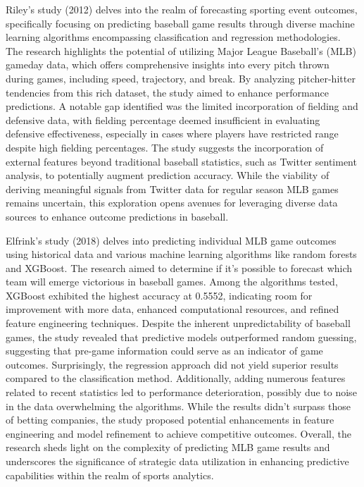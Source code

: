 \documentclass[12pt, english]{article}
\begin{document}
Riley's study (2012) delves into the realm of forecasting sporting event outcomes, specifically focusing on predicting baseball game results through diverse machine learning algorithms encompassing classification and regression methodologies. The research highlights the potential of utilizing Major League Baseball's (MLB) gameday data, which offers comprehensive insights into every pitch thrown during games, including speed, trajectory, and break. By analyzing pitcher-hitter tendencies from this rich dataset, the study aimed to enhance performance predictions. A notable gap identified was the limited incorporation of fielding and defensive data, with fielding percentage deemed insufficient in evaluating defensive effectiveness, especially in cases where players have restricted range despite high fielding percentages. The study suggests the incorporation of external features beyond traditional baseball statistics, such as Twitter sentiment analysis, to potentially augment prediction accuracy. While the viability of deriving meaningful signals from Twitter data for regular season MLB games remains uncertain, this exploration opens avenues for leveraging diverse data sources to enhance outcome predictions in baseball.

Elfrink's study (2018) delves into predicting individual MLB game outcomes using historical data and various machine learning algorithms like random forests and XGBoost. The research aimed to determine if it's possible to forecast which team will emerge victorious in baseball games. Among the algorithms tested, XGBoost exhibited the highest accuracy at 0.5552, indicating room for improvement with more data, enhanced computational resources, and refined feature engineering techniques. Despite the inherent unpredictability of baseball games, the study revealed that predictive models outperformed random guessing, suggesting that pre-game information could serve as an indicator of game outcomes. Surprisingly, the regression approach did not yield superior results compared to the classification method. Additionally, adding numerous features related to recent statistics led to performance deterioration, possibly due to noise in the data overwhelming the algorithms. While the results didn't surpass those of betting companies, the study proposed potential enhancements in feature engineering and model refinement to achieve competitive outcomes. Overall, the research sheds light on the complexity of predicting MLB game results and underscores the significance of strategic data utilization in enhancing predictive capabilities within the realm of sports analytics.
\end{document}
